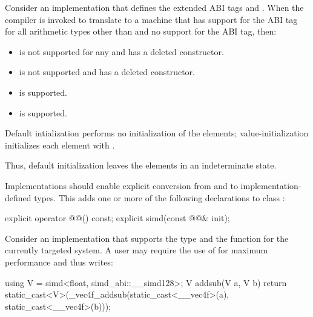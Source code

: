 \begin{example}
  Consider an implementation that defines the extended ABI tags  and . When the compiler is invoked to translate to a machine that has support for the  ABI tag for all arithmetic types other than  and no support for the  ABI tag, then:
  \begin{itemize}
    \item {} is not supported for any  and has a deleted constructor.
    \item {} is not supported and has a deleted constructor.
    \item {} is supported.
    \item {} is supported.
  \end{itemize}
\end{example}

\pnum
Default intialization performs no initialization of the elements; value-initialization initializes each element with . \begin{note}Thus, default initialization leaves the elements in an indeterminate state.\end{note}

\pnum
Implementations should enable explicit conversion from and to implementation-defined types. This adds one or more of the following declarations to class :

\begin{codeblock}
explicit operator @@() const;
explicit simd(const @@& init);
\end{codeblock}

\begin{example}
  Consider an implementation that supports the type  and the function  for the currently targeted system.
  A user may require the use of  for maximum performance and thus writes:
  \begin{codeblock}
    using V = simd<float, simd_abi::__simd128>;
    V addsub(V a, V b) {
      return static_cast<V>(_vec4f_addsub(static_cast<__vec4f>(a), static_cast<__vec4f>(b)));
    }
  \end{codeblock}
\end{example}

